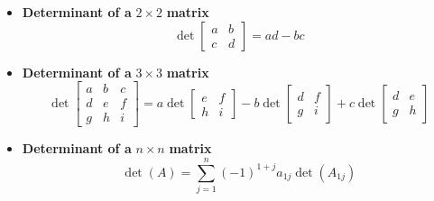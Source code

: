 \documentclass[titlepage,a4paper]{article}
\begin{document}
\begin{itemize}
				\item \textbf{Determinant of a} $2\times2$ \textbf{matrix}
					\begin{equation}
						\det
						\left[
							\begin{matrix}
								a & b \\
								c & d
							\end{matrix}
						\right]
						=ad-bc
					\end{equation}
				\item \textbf{Determinant of a} $3\times3$ \textbf{matrix}
					\begin{equation}
						\det
						\left[
							\begin{matrix}
								a & b & c \\
								d & e & f \\
								g & h & i
							\end{matrix}
						\right]
						=a\det
						\left[
							\begin{matrix}
								e & f \\
								h & i
							\end{matrix}
						\right]
						-b\det
						\left[
							\begin{matrix}
								d & f \\
								g & i
							\end{matrix}
						\right]
						+c\det
						\left[
							\begin{matrix}
								d & e \\
								g & h
							\end{matrix}
						\right]
					\end{equation}
				\item \textbf{Determinant of a} $n\times n$ \textbf{matrix}
					\begin{equation}
						\det(A)=\sum_{j=1}^n(-1)^{1+j}a_{1j}\det(A_{1j})
					\end{equation}
			\end{itemize}
\end{document}
